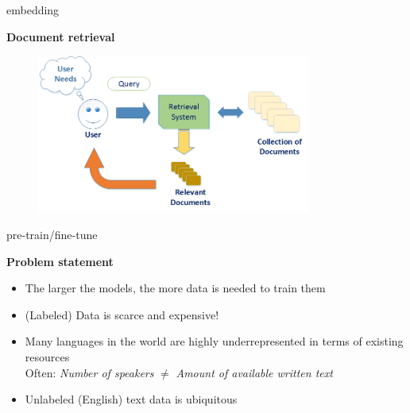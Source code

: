 
\begin{frame}{embedding}
	
\vfill

\textbf{Document retrieval}

\begin{figure}
	\centering
		\includegraphics[width = 9cm]{figure/retrieval.png}\\ 
\end{figure}

\vfill

	
\end{frame}


\begin{frame}{pre-train/fine-tune}

\vfill

\textbf{Problem statement}

\begin{itemize}
	\item The larger the models, the more data is needed to train them
	\item (Labeled) Data is scarce and expensive!
	\item Many languages in the world are highly underrepresented in terms of existing resources\\
				Often: \textit{Number of speakers} $\neq$ \textit{Amount of available written text}
	\item Unlabeled (English) text data is ubiquitous
\end{itemize}
	
\vfill

\end{frame}

